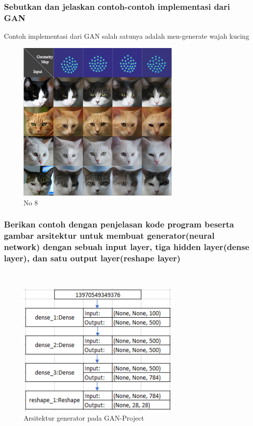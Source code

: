 \subsubsection{Sebutkan dan jelaskan contoh-contoh implementasi dari GAN}
\hfill\break
Contoh implementasi dari GAN salah satunya adalah men-generate wajah kucing
\begin{figure}[H]
	\centering
	\includegraphics[width=8cm]{figures/1174087/8/8.png}
	\caption{No 8}
\end{figure}

\subsubsection{Berikan contoh dengan penjelasan kode program beserta gambar arsitektur untuk membuat generator(neural network) dengan sebuah input layer, tiga hidden layer(dense layer), dan satu output layer(reshape layer)}
\hfill\\
\begin{figure}[H]
	\centering
	\includegraphics[width=8cm]{figures/1174087/8/3a.png}
	\caption{Arsitektur generator pada GAN-Project}
\end{figure}


